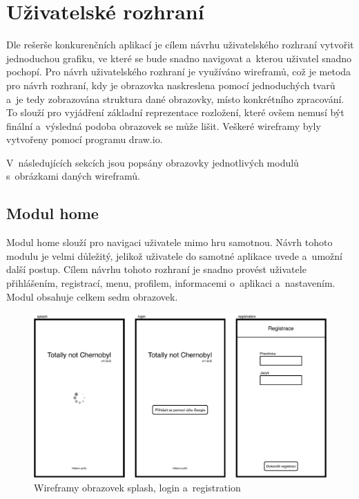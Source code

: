 \section{Uživatelské rozhraní}

Dle rešerše konkurenčních aplikací je cílem návrhu uživatelského rozhraní
vytvořit jednoduchou grafiku,
ve které se bude snadno navigovat a~kterou uživatel snadno pochopí.
Pro návrh uživatelského rozhraní je využíváno wireframů,
což je metoda pro návrh rozhraní,
kdy je obrazovka naskreslena pomocí jednoduchých tvarů
a~je tedy zobrazována struktura dané obrazovky,
místo konkrétního zpracování.
To slouží pro vyjádření základní reprezentace rozložení,
které ovšem nemusí být finální a~výsledná podoba obrazovek se může lišit. 
Veškeré wireframy byly vytvořeny pomocí programu draw.io.

V~následujících sekcích jsou popsány obrazovky jednotlivých modulů
s~obrázkami daných wireframů.

\subsection{Modul home}

Modul home slouží pro navigaci uživatele mimo hru samotnou.
Návrh tohoto modulu je velmi důležitý,
jelikož uživatele do samotné aplikace uvede a~umožní další postup.
Cílem návrhu tohoto rozhraní je snadno provést uživatele přihlášením,
registrací, menu, profilem, informacemi o~aplikaci a~nastavením.
Modul obsahuje celkem sedm obrazovek.

\begin{figure}
    \centering
    \includegraphics[width=1\linewidth]{assets/design/wireframes/home-1.pdf}
    \caption{Wireframy obrazovek splash, login a~registration}
    \label{fig:ui-home-1}
\end{figure}

